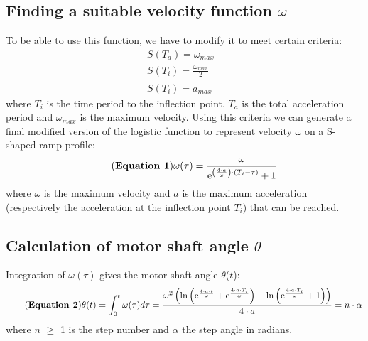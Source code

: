 \documentclass[hidelinks, 11pt, fleqn]{article}   	%
\begin{document}
\subsection{Finding a suitable velocity function $\omega$}
To be able to use this function, we have to modify it to meet certain criteria:
\begin{align*}
S(T_{a}) = \omega_{max} & \\
S(T_{i}) = \frac{\omega_{max}}{2} & \\
\dot{S}(T_{i}) = a_{max}
\end{align*}
\newline
where $T_{i}$ is the time period to the inflection point, $T_{a}$ is the total acceleration period and $\omega_{max}$ is the maximum velocity.
\newline
\newline
Using this criteria we can generate a final modified version of the logistic function to represent velocity $\omega$ on a S-shaped ramp profile:
\begin{equation}\tag{\textbf{Equation 1}}\label{eq:velocity}
\omega(\tau) = \frac{\omega}{\mathrm{e}^{\left(\frac{4 \cdot a}{\omega}\right) \cdot \left(T_{i} - \tau\right)}+1}
\end{equation}
\newline
where $\omega$ is the maximum velocity and $a$ is the maximum acceleration (respectively the acceleration at the inflection point $T_{i}$) that can be reached.
\subsection{Calculation of motor shaft angle $\theta$}
Integration of $\omega(\tau)$ gives the motor shaft angle $\theta$($t$):
%
\begin{equation}\tag{\textbf{Equation 2}}\label{eq:shaftangle}
\theta(t) = \int_{0}^{t} \omega(\tau)d\tau = \dfrac{\omega^2\left(\ln\left(\mathrm{e}^\frac{4 \cdot a \cdot t}{\omega}+\mathrm{e}^\frac{4 \cdot a \cdot T_{i}}{\omega}\right)-\ln\left(\mathrm{e}^\frac{4 \cdot a \cdot T_{i}}{\omega}+1\right)\right)}{4 \cdot a} = n \cdot \alpha
\end{equation}
\newline
where $n$  $\geq$ 1 is the step number and $\alpha$ the step angle in radians.
\newline
\newline
\end{document}
